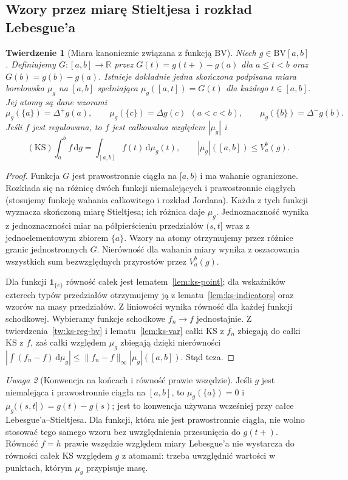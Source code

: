 \documentclass[11pt,a4paper]{article}
\numberwithin{equation}{section}
\theoremstyle{plain}
\newtheorem{twierdzenie}{Twierdzenie}[section]
\theoremstyle{definition}
\theoremstyle{remark}
\newtheorem{uwaga}[twierdzenie]{Uwaga}
\newcommand{\R}{\mathbb R}
\newcommand{\ind}[1]{\mathbf 1_{#1}}
\newcommand{\BV}{\mathrm{BV}}
\newcommand{\KS}{\mathrm{KS}}
\begin{document}
\subsection*{Wzory przez miarę Stieltjesa i rozkład Lebesgue'a}
\begin{twierdzenie}[Miara kanonicznie związana z funkcją $\BV$]
\label{tw:ks-measure}
Niech $g\in\BV[a,b]$. Definiujemy $G:[a,b]\to\R$ przez $G(t)=g(t+)-g(a)$ dla $a\le t<b$ oraz $G(b)=g(b)-g(a)$. Istnieje dokładnie jedna skończona \emph{podpisana miara borelowska} $\mu_g$ na $[a,b]$ spełniająca $\mu_g([a,t])=G(t)$ dla każdego $t\in[a,b]$. Jej atomy są dane wzorami
\[
 \mu_g(\{a\})=\Delta^+g(a),\qquad
 \mu_g(\{c\})=\Delta g(c)\ \ (a<c<b),\qquad
 \mu_g(\{b\})=\Delta^-g(b).
\]
Jeśli $f$ jest regulowana, to $f$ jest całkowalna względem $|\mu_g|$ i
\[
 (\KS)\int_a^b f\,\mathrm dg=\int_{[a,b]}f(t)\,\mathrm d\mu_g(t),
 \qquad |\mu_g|([a,b])\le V_a^b(g).
\]
\end{twierdzenie}
\begin{proof}
Funkcja $G$ jest prawostronnie ciągła na $[a,b)$ i ma wahanie ograniczone. Rozkłada się na różnicę dwóch funkcji niemalejących i prawostronnie ciągłych (stosujemy funkcję wahania całkowitego i rozkład Jordana). Każda z tych funkcji wyznacza skończoną miarę Stieltjesa; ich różnica daje $\mu_g$. Jednoznaczność wynika z jednoznaczności miar na półpierścieniu przedziałów $(s,t]$ wraz z jednoelementowym zbiorem $\{a\}$. Wzory na atomy otrzymujemy przez różnice granic jednostronnych $G$. Nierówność dla wahania miary wynika z oszacowania wszystkich sum bezwzględnych przyrostów przez $V_a^b(g)$.

Dla funkcji $\ind{\{c\}}$ równość całek jest lematem~\ref{lem:ks-point}; dla wskaźników czterech typów przedziałów otrzymujemy ją z lematu~\ref{lem:ks-indicators} oraz wzorów na masy przedziałów. Z liniowości wynika równość dla każdej funkcji schodkowej. Wybieramy funkcje schodkowe $f_n\to f$ jednostajnie. Z twierdzenia~\ref{tw:ks-reg-bv} i lematu~\ref{lem:ks-var} całki KS z $f_n$ zbiegają do całki KS z $f$, zaś całki względem $\mu_g$ zbiegają dzięki nierówności $|\int(f_n-f)\,\mathrm d\mu_g|\le\|f_n-f\|_\infty|\mu_g|([a,b])$. Stąd teza.
\end{proof}

\begin{uwaga}[Konwencja na końcach i równość prawie wszędzie]
Jeśli $g$ jest niemalejąca i prawostronnie ciągła na $[a,b]$, to $\mu_g(\{a\})=0$ i $\mu_g((s,t])=g(t)-g(s)$; jest to konwencja używana wcześniej przy całce Lebesgue'a--Stieltjesa. Dla funkcji, która nie jest prawostronnie ciągła, nie wolno stosować tego samego wzoru bez uwzględnienia przesunięcia do $g(t+)$. Równość $f=h$ prawie wszędzie względem miary Lebesgue'a nie wystarcza do równości całek KS względem $g$ z atomami: trzeba uwzględnić wartości w punktach, którym $\mu_g$ przypisuje masę.
\end{uwaga}
\end{document}
